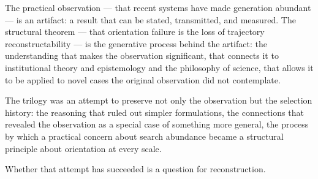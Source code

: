 The practical observation --- that recent systems have made generation abundant
--- is an artifact: a result that can be stated, transmitted, and measured.
The structural theorem --- that orientation failure is the loss of trajectory
reconstructability --- is the generative process behind the artifact: the
understanding that makes the observation significant, that connects it to
institutional theory and epistemology and the philosophy of science, that
allows it to be applied to novel cases the original observation did not
contemplate.

The trilogy was an attempt to preserve not only the observation but the
selection history: the reasoning that ruled out simpler formulations, the
connections that revealed the observation as a special case of something
more general, the process by which a practical concern about search abundance
became a structural principle about orientation at every scale.

Whether that attempt has succeeded is a question for reconstruction.

